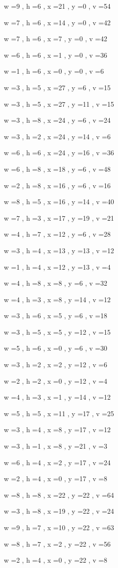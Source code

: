 \documentclass[11pt]{article}
\begin{document}
w =9 , h =6 , x =21 , y =0 , v =54
\par
w =7 , h =6 , x =14 , y =0 , v =42
\par
w =7 , h =6 , x =7 , y =0 , v =42
\par
w =6 , h =6 , x =1 , y =0 , v =36
\par
w =1 , h =6 , x =0 , y =0 , v =6
\par
w =3 , h =5 , x =27 , y =6 , v =15
\par
w =3 , h =5 , x =27 , y =11 , v =15
\par
w =3 , h =8 , x =24 , y =6 , v =24
\par
w =3 , h =2 , x =24 , y =14 , v =6
\par
w =6 , h =6 , x =24 , y =16 , v =36
\par
w =6 , h =8 , x =18 , y =6 , v =48
\par
w =2 , h =8 , x =16 , y =6 , v =16
\par
w =8 , h =5 , x =16 , y =14 , v =40
\par
w =7 , h =3 , x =17 , y =19 , v =21
\par
w =4 , h =7 , x =12 , y =6 , v =28
\par
w =3 , h =4 , x =13 , y =13 , v =12
\par
w =1 , h =4 , x =12 , y =13 , v =4
\par
w =4 , h =8 , x =8 , y =6 , v =32
\par
w =4 , h =3 , x =8 , y =14 , v =12
\par
w =3 , h =6 , x =5 , y =6 , v =18
\par
w =3 , h =5 , x =5 , y =12 , v =15
\par
w =5 , h =6 , x =0 , y =6 , v =30
\par
w =3 , h =2 , x =2 , y =12 , v =6
\par
w =2 , h =2 , x =0 , y =12 , v =4
\par
w =4 , h =3 , x =1 , y =14 , v =12
\par
w =5 , h =5 , x =11 , y =17 , v =25
\par
w =3 , h =4 , x =8 , y =17 , v =12
\par
w =3 , h =1 , x =8 , y =21 , v =3
\par
w =6 , h =4 , x =2 , y =17 , v =24
\par
w =2 , h =4 , x =0 , y =17 , v =8
\par
w =8 , h =8 , x =22 , y =22 , v =64
\par
w =3 , h =8 , x =19 , y =22 , v =24
\par
w =9 , h =7 , x =10 , y =22 , v =63
\par
w =8 , h =7 , x =2 , y =22 , v =56
\par
w =2 , h =4 , x =0 , y =22 , v =8
\par
\newpage
\end{document}
